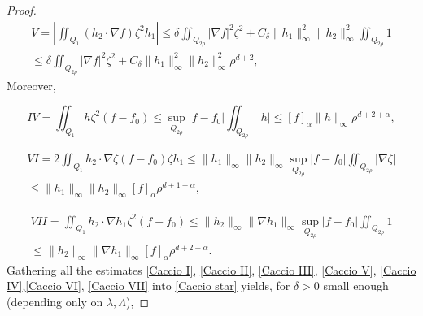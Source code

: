 \documentclass[reqno,12pt,twoside]{amsart}
\numberwithin{equation}{section} \numberwithin{theorem}{section}
\numberwithin{proposition}{section} \numberwithin{lemma}{section}
\numberwithin{corollary}{section}
\numberwithin{definition}{section} \numberwithin{remark}{section}
\begin{document}
\begin{proof}
\begin{multline}\label{Caccio V}
V = \left|\iint_{Q_1}( h_2\cdot \nabla f ) \zeta^2 h_1 \right| \leqslant \delta  \iint_{Q_{2\rho}} |\nabla f|^2 \zeta^2 + C_\delta \|h_1\|_\infty^2 \|h_2\|_\infty^2 \iint_{Q_{2\rho}} 1\\
\leqslant \delta  \iint_{Q_{2\rho}} |\nabla f|^2 \zeta^2 +  C_\delta \|h_1\|_\infty^2 \|h_2\|_\infty^2 \rho^{d+2},  
\end{multline}
Moreover,

\begin{equation}\label{Caccio IV}
IV =\iint_{Q_1} h\zeta^2 (f -f_0) \leqslant \sup_{Q_{2\rho}} |f-f_0|\iint_{Q_{2\rho}} |h| \leqslant [f]_\alpha \|h\|_{\infty} \rho^{d+2+\alpha},
\end{equation}

\begin{multline}\label{Caccio VI}
VI =  2\iint_{Q_1} h_2\cdot \nabla \zeta (f-f_0) \zeta h_1 \leqslant \|h_1\|_\infty \|h_2\|_\infty \sup_{Q_{2\rho}} |f-f_0| \iint_{Q_{2\rho}} |\nabla \zeta|\\
\leqslant \|h_1\|_\infty \|h_2\|_\infty [f]_\alpha \rho^{d+1+\alpha},
\end{multline}

\begin{multline}\label{Caccio VII}
VII =\iint_{Q_1} h_2 \cdot \nabla h_1 \zeta^2 (f-f_0) \leqslant \|h_2\|_\infty \|\nabla h_1\|_\infty \sup_{Q_{2\rho}} |f-f_0| \iint_{Q_{2\rho}} 1\\
\leqslant \|h_2\|_\infty \|\nabla h_1\|_\infty [f]_\alpha \rho^{d+2+\alpha}.
\end{multline}
Gathering all the estimates \eqref{Caccio I}, \eqref{Caccio II}, \eqref{Caccio III},  \eqref{Caccio V}, \eqref{Caccio IV},\eqref{Caccio VI}, \eqref{Caccio VII} into \eqref{Caccio star} yields, for $\delta > 0$ small enough (depending only on $\lambda, \Lambda$),


\end{proof}
\end{document}

